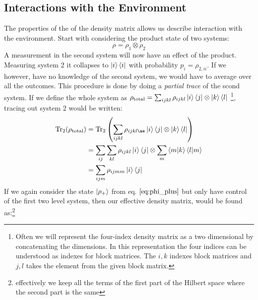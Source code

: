 \subsection{Interactions with the Environment}\label{sec:density_with_env}
The properties of the of the density matrix allows us describe interaction with the environment. Start with considering the product state of two systems:
\begin{equation}
    \rho = \rho_1 \otimes \rho_2
\end{equation}
A measurement in the second system will now have an effect of the product. Measuring system 2 it collapses to $\ket{i}\bra{i}$ with probability $p_i = \rho_{2, ii}$. If we however, have no knowledge of the second system, we would have to average over all the outcomes. This procedure is done by doing a \textit{partial trace} of the scond system. If we define the whole system as $\rho_{\text{total}} = \sum_{ijkl}\rho_{ijkl}\ket{i}\bra{j}\otimes\ket{k}\bra{l}$ \footnote{Often we will represent the four-index density matrix as a two dimensional by concatenating the dimensions. In this representation the four indices can be understood as indexes for block matrices. The $i, k$ indexes block matrices and $j, l$ takes the element from the given block matrix.}, tracing out system 2 would be written:
\begin{align}
    \Tr_2 (\rho_{\text{total}})   &= \Tr_2 \left(\sum_{ijkl} \rho_{ijklæ} \ket{i}\bra{j} \otimes \ket{k}\bra{l}\right) \nonumber \\
                                    &= \sum_{ij}\sum_{kl} \rho_{ijkl} \ket{i}\bra{j} \otimes \sum_m \bra{m}  \ket{k}\bra{l}\ket{m} \nonumber \\
    &= \sum_{ijm} \rho_{ijmm} \ket{i}\bra{j}
\end{align}
If we again consider the state $\ket{\rho_+}$ from eq. $\ref{eq:phi_plus}$ but only have control of the first two level system, then our effective density matrix, would be found as:\footnote{effectively we keep all the terms of the first part of the Hilbert space where the second part is the same}
